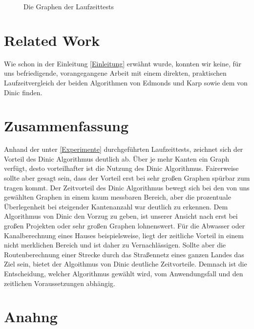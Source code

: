 \documentclass[a4paper]{llncs}
\begin{document}
\begin{figure}[H]
\label{fig:testgraph3}
\caption{Die Graphen der Laufzeittests} 
\end{figure}


\section{Related Work}
\label{Related Work}
Wie schon in der Einleitung \ref{Einleitung} erwähnt wurde, konnten wir keine, für uns befriedigende, vorangegangene Arbeit mit einem direkten, praktischen Laufzeitvergleich der beiden Algorithmen von Edmonds und Karp sowie dem von Dinic finden.

\section{Zusammenfassung}
\label{Zusammenfassung}
Anhand der unter \ref{Experimente} durchgeführten Laufzeittests, zeichnet sich der Vorteil des Dinic Algorithmus deutlich ab. Über je mehr Kanten ein Graph verfügt, desto vorteilhafter ist die Nutzung des Dinic Algorithmus. Fairerweise sollte aber gesagt sein, dass der Vorteil erst bei sehr großen Graphen spürbar zum tragen kommt. Der Zeitvorteil des Dinic Algorithmus bewegt sich bei den von uns gewählten Graphen in einem kaum messbaren Bereich, aber die prozentuale Überlegenheit bei steigender Kantenanzahl war deutlich zu erkennen. Dem Algorithmus von Dinic den Vorzug zu geben, ist unserer Ansicht nach erst bei großen Projekten oder sehr großen Graphen lohnenswert. Für die Abwasser oder Kanalberechnung eines Hauses beispielsweise, liegt der zeitliche Vorteil in einem nicht merklichen Bereich und ist daher zu Vernachlässigen. Sollte aber die Routenberechnung einer Strecke durch das Straßennetz eines ganzen Landes das Ziel sein, bietet der Algoithmus von Dinic deutliche Zeitvorteile. Demnach ist die Entscheidung, welcher Algorithmus gewählt wird, vom Anwendungsfall und den zeitlichen Voraussetzungen abhängig.

\section{Anahng}



 
\end{document}
